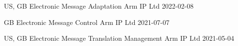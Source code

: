 \begin{cvawards}

\cvaward
  {US, GB} %
  {Electronic Message Adaptation}
  {Arm IP Ltd}
  {2022-02-08}

\cvaward
  {GB} %
  {Electronic Message Control}
  {Arm IP Ltd}
  {2021-07-07}

\cvaward
  {US, GB}
  {Electronic Message Translation Management}
  {Arm IP Ltd}
  {2021-05-04}

\end{cvawards}
